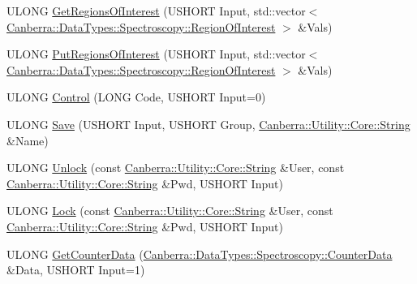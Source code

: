\begin{DoxyCompactItemize}
\item 
U\+L\+O\+NG \hyperlink{class_canberra_1_1_protocols_1_1_lynx_1_1_device_ae0f2af17d866f3fc8dace49b3dc25534_ae0f2af17d866f3fc8dace49b3dc25534}{Get\+Regions\+Of\+Interest} (U\+S\+H\+O\+RT Input, std\+::vector$<$ \hyperlink{class_canberra_1_1_data_types_1_1_spectroscopy_1_1_region_of_interest}{Canberra\+::\+Data\+Types\+::\+Spectroscopy\+::\+Region\+Of\+Interest} $>$ \&Vals)
\item 
U\+L\+O\+NG \hyperlink{class_canberra_1_1_protocols_1_1_lynx_1_1_device_a2b7b1dbbf2391cbbb503ea253aed164b_a2b7b1dbbf2391cbbb503ea253aed164b}{Put\+Regions\+Of\+Interest} (U\+S\+H\+O\+RT Input, std\+::vector$<$ \hyperlink{class_canberra_1_1_data_types_1_1_spectroscopy_1_1_region_of_interest}{Canberra\+::\+Data\+Types\+::\+Spectroscopy\+::\+Region\+Of\+Interest} $>$ \&Vals)
\item 
U\+L\+O\+NG \hyperlink{class_canberra_1_1_protocols_1_1_lynx_1_1_device_a17049b0e2fd8ab1d6f1181f7656ee6a7_a17049b0e2fd8ab1d6f1181f7656ee6a7}{Control} (L\+O\+NG Code, U\+S\+H\+O\+RT Input=0)
\item 
U\+L\+O\+NG \hyperlink{class_canberra_1_1_protocols_1_1_lynx_1_1_device_a4f514bd2a06da196fbe8f63cde8d4870_a4f514bd2a06da196fbe8f63cde8d4870}{Save} (U\+S\+H\+O\+RT Input, U\+S\+H\+O\+RT Group, \hyperlink{class_canberra_1_1_utility_1_1_core_1_1_string}{Canberra\+::\+Utility\+::\+Core\+::\+String} \&Name)
\item 
U\+L\+O\+NG \hyperlink{class_canberra_1_1_protocols_1_1_lynx_1_1_device_ab5f8a362b339768e8f3cde9633be6b87_ab5f8a362b339768e8f3cde9633be6b87}{Unlock} (const \hyperlink{class_canberra_1_1_utility_1_1_core_1_1_string}{Canberra\+::\+Utility\+::\+Core\+::\+String} \&User, const \hyperlink{class_canberra_1_1_utility_1_1_core_1_1_string}{Canberra\+::\+Utility\+::\+Core\+::\+String} \&Pwd, U\+S\+H\+O\+RT Input)
\item 
U\+L\+O\+NG \hyperlink{class_canberra_1_1_protocols_1_1_lynx_1_1_device_ad6b49e66d88c9624d344532c8c0f16af_ad6b49e66d88c9624d344532c8c0f16af}{Lock} (const \hyperlink{class_canberra_1_1_utility_1_1_core_1_1_string}{Canberra\+::\+Utility\+::\+Core\+::\+String} \&User, const \hyperlink{class_canberra_1_1_utility_1_1_core_1_1_string}{Canberra\+::\+Utility\+::\+Core\+::\+String} \&Pwd, U\+S\+H\+O\+RT Input)
\item 
U\+L\+O\+NG \hyperlink{class_canberra_1_1_protocols_1_1_lynx_1_1_device_ac77d98daff94392709601858b2980766_ac77d98daff94392709601858b2980766}{Get\+Counter\+Data} (\hyperlink{class_canberra_1_1_data_types_1_1_spectroscopy_1_1_counter_data}{Canberra\+::\+Data\+Types\+::\+Spectroscopy\+::\+Counter\+Data} \&Data, U\+S\+H\+O\+RT Input=1)

\end{DoxyCompactItemize}
